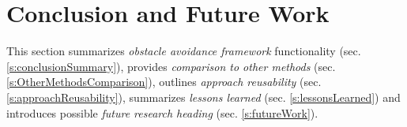 \cleardoublepage
\chapter{Conclusion and Future Work}\label{ch:Conclusion}
\noindent This section summarizes \emph{obstacle avoidance framework} functionality (sec. \ref{s:conclusionSummary}), provides \emph{comparison to other methods} (sec. \ref{s:OtherMethodsComparison}), outlines \emph{approach reusability} (sec. \ref{s:approachReusability}), summarizes \emph{lessons learned} (sec. \ref{s:lessonsLearned}) and introduces possible \emph{future research heading} (sec. \ref{s:futureWork}).